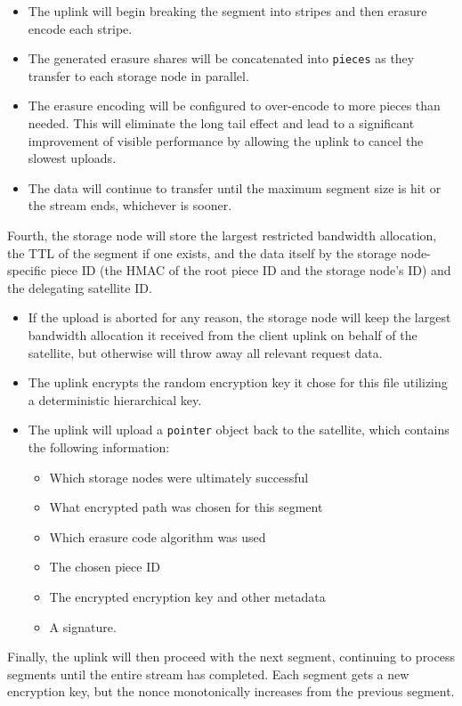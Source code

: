 \documentclass[11pt,fleqn,openany]{book}
\newcommand{\x}[1]{{\tt #1}} \newcommand{\code}[1]{{\em #1}}
\begin{document}
\begin{itemize}
\item The uplink will begin breaking the segment into stripes and then
  erasure encode each stripe.
\item The generated erasure shares will be concatenated into \x{pieces} as they
  transfer to each storage node in parallel.
\item The erasure encoding will be configured to over-encode to more pieces
  than needed. This will eliminate the long tail effect and lead to a
  significant improvement of visible performance by allowing the uplink to
  cancel the slowest uploads.
\item The data will continue to transfer until the maximum segment size is hit
  or the stream ends, whichever is sooner.
\end{itemize}

Fourth, the storage node will store the largest restricted bandwidth allocation,
the TTL of the segment if one exists, and the data itself by the storage
node-specific piece ID (the HMAC of the root piece ID and the storage node's
ID) and the delegating satellite ID.

\begin{itemize}
\item If the upload is aborted for any reason, the storage node will keep the
  largest bandwidth allocation it received from the client uplink on behalf of
  the satellite, but otherwise will throw away all relevant request data.
\item The uplink encrypts the random encryption key it chose for this file
  utilizing a deterministic hierarchical key.
\item The uplink will upload a \x{pointer} object back to the satellite, which
  contains the following information:
  \begin{itemize}
  \item Which storage nodes were ultimately successful
  \item What encrypted path was chosen for this segment
  \item Which erasure code algorithm was used
  \item The chosen piece ID
  \item The encrypted encryption key and other metadata
  \item A signature.
  \end{itemize}
\end{itemize}

Finally, the uplink will then proceed with the next segment, continuing to
process segments until the entire stream has completed. Each segment gets
a new encryption key, but the nonce monotonically increases from the previous
segment.
\end{document}
